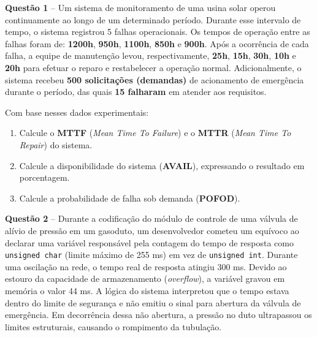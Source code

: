 \documentclass[12pt,a4paper]{article}
\newcommand{\resposta}[1]{
\noindent
\framebox[\textwidth]{
\begin{minipage}{0.98\textwidth}
\vspace*{#1}\null
\end{minipage}
}
}
\begin{document}
\vspace{0.5cm}

\textbf{Questão 1} -- Um sistema de monitoramento de uma usina solar operou continuamente ao longo de um determinado período. Durante esse intervalo de tempo, o sistema registrou 5 falhas operacionais. Os tempos de operação entre as falhas foram de: \textbf{1200h}, \textbf{950h}, \textbf{1100h}, \textbf{850h} e \textbf{900h}. Após a ocorrência de cada falha, a equipe de manutenção levou, respectivamente, \textbf{25h}, \textbf{15h}, \textbf{30h}, \textbf{10h} e \textbf{20h} para efetuar o reparo e restabelecer a operação normal. Adicionalmente, o sistema recebeu \textbf{500 solicitações (demandas)} de acionamento de emergência durante o período, das quais \textbf{15 falharam} em atender aos requisitos.

\vspace{0.2cm}

Com base nesses dados experimentais:

\begin{enumerate}[label=\textbf{\alph*)}]
    \item Calcule o \textbf{MTTF} (\textit{Mean Time To Failure}) e o \textbf{MTTR} (\textit{Mean Time To Repair}) do sistema.
    \item Calcule a disponibilidade do sistema (\textbf{AVAIL}), expressando o resultado em porcentagem.
    \item Calcule a probabilidade de falha sob demanda (\textbf{POFOD}).
\end{enumerate}

\vspace{0.2cm}
\resposta{7.5cm}

\vspace{0.5cm}

\textbf{Questão 2} -- Durante a codificação do módulo de controle de uma válvula de alívio de pressão em um gasoduto, um desenvolvedor cometeu um equívoco ao declarar uma variável responsável pela contagem do tempo de resposta como \texttt{unsigned char} (limite máximo de 255 ms) em vez de \texttt{unsigned int}. Durante uma oscilação na rede, o tempo real de resposta atingiu 300 ms. Devido ao estouro da capacidade de armazenamento (\textit{overflow}), a variável gravou em memória o valor 44 ms. A lógica do sistema interpretou que o tempo estava dentro do limite de segurança e não emitiu o sinal para abertura da válvula de emergência. Em decorrência dessa não abertura, a pressão no duto ultrapassou os limites estruturais, causando o rompimento da tubulação.
\end{document}
